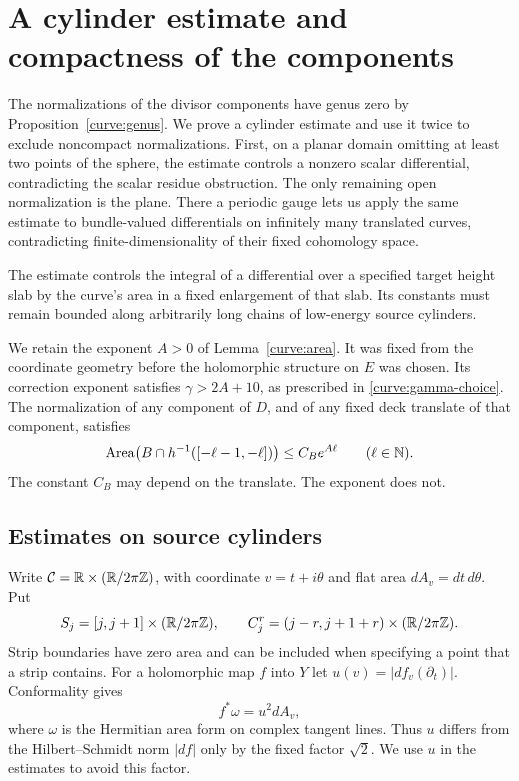 \section{A cylinder estimate and compactness of the components}
\label{sec:cylinder}

The normalizations of the divisor components have genus zero by
Proposition~\ref{curve:genus}. We prove a cylinder estimate and use it
twice to exclude noncompact normalizations. First, on a planar domain
omitting at least two points of the sphere, the estimate controls a
nonzero scalar differential, contradicting the scalar residue
obstruction. The only remaining open normalization is the plane.
There a periodic gauge lets us apply the same estimate to bundle-valued
differentials on infinitely many translated curves, contradicting
finite-dimensionality of their fixed cohomology space.

The estimate controls the integral of a differential over a specified
target height slab by the curve's area in a fixed enlargement of that
slab. Its constants must remain bounded along arbitrarily long chains
of low-energy source cylinders.

We retain the exponent $A>0$ of Lemma~\ref{curve:area}.
It was fixed from the coordinate geometry before the holomorphic structure
on $E$ was chosen.  Its correction exponent satisfies
$\gamma>2A+10$, as prescribed in \eqref{curve:gamma-choice}.
The normalization of any component of $D$, and of any fixed deck
translate of that component, satisfies
\begin{equation}\label{cylinder:area-input}
 \operatorname{Area}\bigl(B\cap h^{-1}([-\ell-1,-\ell])\bigr)
       \leq C_B e^{A\ell}\qquad(\ell\in\mathbb N).
\end{equation}
The constant $C_B$ may depend on the translate.  The exponent does not.

\subsection{Estimates on source cylinders}

Write $\mathcal C=\mathbb R\times(\mathbb R/2\pi\mathbb Z)$, with coordinate
$v=t+i\theta$ and flat area $dA_v=dt\,d\theta$.  Put
\[
 S_j=[j,j+1]\times(\mathbb R/2\pi\mathbb Z),\qquad
 C_j^r=(j-r,j+1+r)\times(\mathbb R/2\pi\mathbb Z).
\]
Strip boundaries have zero area and can be included when specifying a
point that a strip contains.  For a holomorphic map $f$ into $Y$ let
$u(v)=|df_v(\partial_t)|$.  Conformality gives
\begin{equation}\label{cylinder:energy}
 f^*\omega=u^2dA_v,
\end{equation}
where $\omega$ is the Hermitian area form on complex tangent lines.
Thus $u$ differs from the Hilbert--Schmidt norm $|df|$ only by the fixed
factor $\sqrt2$.  We use $u$ in the estimates to avoid this factor.

